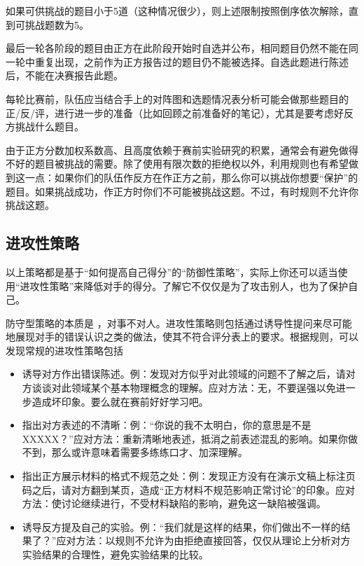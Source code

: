 \documentclass[a4paper,10pt,english]{sphinxmanual}
\begin{document}
如果可供挑战的题目小于5道（这种情况很少），则上述限制按照倒序依次解除，直到可挑战题数为5。

最后一轮各阶段的题目由正方在此阶段开始时自选并公布，相同题目仍然不能在同一轮中重复出现，之前作为正方报告过的题目仍不能被选择。自选此题进行陈述后，不能在决赛报告此题。

每轮比赛前，队伍应当结合手上的对阵图和选题情况表分析可能会做那些题目的正/反/评，进行进一步的准备（比如回顾之前准备好的笔记），尤其是要考虑好反方挑战什么题目。

由于正方分数加权系数高、且高度依赖于赛前实验研究的积累，通常会有避免做得不好的题目被挑战的需要。除了使用有限次数的拒绝权以外，利用规则也有希望做到这一点：如果你们的队伍作反方在作正方之前，那么你可以挑战你想要“保护”的题目。如果挑战成功，作正方时你们不可能被挑战这题。不过，有时规则不允许你挑战这题。


\subsection{进攻性策略}
\label{\detokenize{7. Tournament:id14}}
以上策略都是基于“如何提高自己得分”的“防御性策略”，实际上你还可以适当使用“进攻性策略”来降低对手的得分。了解它不仅仅是为了攻击别人，也为了保护自己。

防守型策略的本质是  ，对事不对人。进攻性策略则包括通过诱导性提问来尽可能地展现对手的错误认识之类的做法，使其不符合评分表上的要求。根据规则，可以发现常规的进攻性策略包括
\begin{itemize}
\item {} 
诱导对方作出错误陈述。例：发现对方似乎对此领域的问题不了解之后，请对方谈谈对此领域某个基本物理概念的理解。应对方法：无，不要逞强以免进一步造成坏印象。要么就在赛前好好学习吧。

\item {} 
指出对方表述的不清晰：例：“你说的我不太明白，你的意思是不是XXXXX？”应对方法：重新清晰地表述，抵消之前表述混乱的影响。如果你做不到，那么或许意味着需要多练练口才、加深理解。

\item {} 
指出正方展示材料的格式不规范之处：例：发现正方没有在演示文稿上标注页码之后，请对方翻到某页，造成“正方材料不规范影响正常讨论”的印象。应对方法：使讨论继续进行，不受材料缺陷的影响，避免这一缺陷被强调。

\item {} 
诱导反方提及自己的实验。例：“我们就是这样的结果，你们做出不一样的结果了？”应对方法：以规则不允许为由拒绝直接回答，仅仅从理论上分析对方实验结果的合理性，避免实验结果的比较。

\end{itemize}
\end{document}
